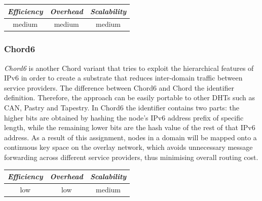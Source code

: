 \begin{center}
\begin{tabular}{ccc}
\emph{Efficiency} & \emph{Overhead} & \emph{Scalability} \\
\hline
medium &
medium &
medium
\end{tabular}
\end{center}

\subsubsection{Chord6}
\emph{Chord6} \cite{xiong_chord6_2005} is another Chord variant that tries to
exploit the hierarchical features of IPv6 in order to create a substrate that
reduces inter-domain traffic between service providers. The difference between
Chord6 and Chord the identifier definition. Therefore, the approach can be
easily portable to other DHTs such as CAN, Pastry and Tapestry. In Chord6 the
identifier contains two parts: the higher bits are obtained by hashing the
node's IPv6 address prefix of specific length, while the remaining lower bits
are the hash value of the rest of that IPv6 address. As a result of this
assignment, nodes in a domain will be mapped onto a continuous key space on the
overlay network, which avoids unnecessary message forwarding across different
service providers, thus minimising overall routing cost.

\begin{center}
\begin{tabular}{ccc}
\emph{Efficiency} & \emph{Overhead} & \emph{Scalability} \\
\hline
low &
low &
medium
\end{tabular}
\end{center}

